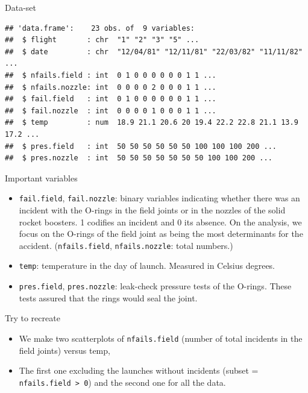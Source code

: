 \documentclass[
  ignorenonframetext,
]{beamer}
\begin{document}
\begin{frame}[fragile]{Data-set}
\protect\hypertarget{data-set}{}
\begin{verbatim}
## 'data.frame':    23 obs. of  9 variables:
##  $ flight       : chr  "1" "2" "3" "5" ...
##  $ date         : chr  "12/04/81" "12/11/81" "22/03/82" "11/11/82" ...
##  $ nfails.field : int  0 1 0 0 0 0 0 0 1 1 ...
##  $ nfails.nozzle: int  0 0 0 0 2 0 0 0 1 1 ...
##  $ fail.field   : int  0 1 0 0 0 0 0 0 1 1 ...
##  $ fail.nozzle  : int  0 0 0 0 1 0 0 0 1 1 ...
##  $ temp         : num  18.9 21.1 20.6 20 19.4 22.2 22.8 21.1 13.9 17.2 ...
##  $ pres.field   : int  50 50 50 50 50 50 100 100 100 200 ...
##  $ pres.nozzle  : int  50 50 50 50 50 50 50 100 100 200 ...
\end{verbatim}
\end{frame}

\begin{frame}[fragile]{Important variables}
\protect\hypertarget{important-variables}{}
\begin{itemize}
\item
  \texttt{fail.field}, \texttt{fail.nozzle}: binary variables indicating
  whether there was an incident with the O-rings in the field joints or
  in the nozzles of the solid rocket boosters. 1 codifies an incident
  and 0 its absence. On the analysis, we focus on the O-rings of the
  field joint as being the most determinants for the accident.
  (\texttt{nfails.field}, \texttt{nfails.nozzle}: total numbers.)
\item
  \texttt{temp}: temperature in the day of launch. Measured in Celsius
  degrees.
\item
  \texttt{pres.field}, \texttt{pres.nozzle}: leak-check pressure tests
  of the O-rings. These tests assured that the rings would seal the
  joint.
\end{itemize}
\end{frame}

\begin{frame}[fragile]{Try to recreate}
\protect\hypertarget{try-to-recreate}{}
\begin{itemize}
\item
  We make two scatterplots of \texttt{nfails.field} (number of total
  incidents in the field joints) versus temp,
\item
  The first one excluding the launches without incidents (subset =
  \texttt{nfails.field\ \textgreater{}\ 0}) and the second one for all
  the data.
\end{itemize}
\end{frame}
\end{document}

